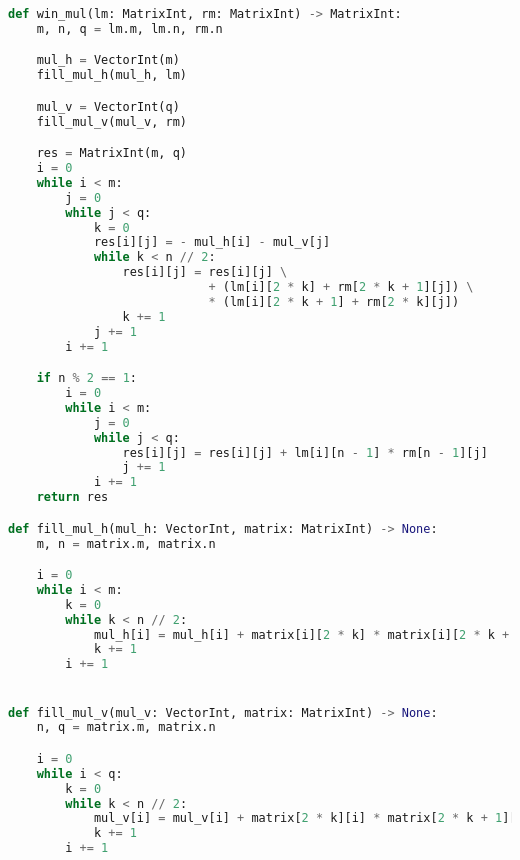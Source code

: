 \begin{lstlisting}[style=mypython, label=lst:win,caption=Функция для перемножения матриц алгоритмом Винограда,language=python]
def win_mul(lm: MatrixInt, rm: MatrixInt) -> MatrixInt:
    m, n, q = lm.m, lm.n, rm.n

    mul_h = VectorInt(m)
    fill_mul_h(mul_h, lm)

    mul_v = VectorInt(q)
    fill_mul_v(mul_v, rm)

    res = MatrixInt(m, q)
    i = 0
    while i < m:
        j = 0
        while j < q:
            k = 0
            res[i][j] = - mul_h[i] - mul_v[j]
            while k < n // 2:
                res[i][j] = res[i][j] \
                            + (lm[i][2 * k] + rm[2 * k + 1][j]) \
                            * (lm[i][2 * k + 1] + rm[2 * k][j])
                k += 1
            j += 1
        i += 1

    if n % 2 == 1:
        i = 0
        while i < m:
            j = 0
            while j < q:
                res[i][j] = res[i][j] + lm[i][n - 1] * rm[n - 1][j]
                j += 1
            i += 1
    return res

def fill_mul_h(mul_h: VectorInt, matrix: MatrixInt) -> None:
    m, n = matrix.m, matrix.n

    i = 0
    while i < m:
        k = 0
        while k < n // 2:
            mul_h[i] = mul_h[i] + matrix[i][2 * k] * matrix[i][2 * k + 1]
            k += 1
        i += 1


def fill_mul_v(mul_v: VectorInt, matrix: MatrixInt) -> None:
    n, q = matrix.m, matrix.n

    i = 0
    while i < q:
        k = 0
        while k < n // 2:
            mul_v[i] = mul_v[i] + matrix[2 * k][i] * matrix[2 * k + 1][i]
            k += 1
        i += 1
\end{lstlisting}


